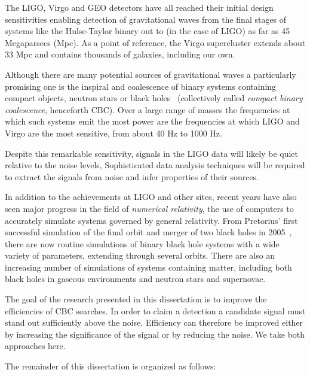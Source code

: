 The LIGO, Virgo and GEO detectors have all reached their initial
design sensitivities enabling detection of gravitational waves from
the final stages of systems like the Hulse-Taylor binary out to (in
the case of LIGO) as far as 45 Megaparsecs (Mpc).  As a point of
reference, the Virgo supercluster extends about 33 Mpc and contains
thousands of galaxies, including our own.

Although there are many potential sources of gravitational waves
a particularly promising one is the inspiral and coalescence of
binary systems containing compact objects, neutron stars or black
holes~\cite{thorne.k:1987} (collectively called \emph{compact binary
coalescence}, henceforth CBC).  Over a large range of masses the
frequencies at which such systems emit the most power are the
frequencies at which LIGO and Virgo are the most sensitive, from about
40 Hz to 1000 Hz.

Despite this remarkable sensitivity, signals in the LIGO data will
likely be quiet relative to the noise levels, Sophisticated data
analysis techniques will be required to extract the signals from noise
and infer properties of their sources.

In addition to the achievements at LIGO and other sites, recent years
have also seen major progress in the field of \emph{numerical
relativity}, the use of computers to accurately simulate systems
governed by general relativity.  From Pretorius' first successful
simulation of the final orbit and merger of two black holes in
2005~\cite{Pretorius:2005gq}, there are now routine simulations of
binary black hole systems with a wide variety of parameters, extending
through several orbits.  There are also an increasing number of
simulations of systems containing matter, including both black holes
in gaseous environments and neutron stars and supernovae.  

The goal of the research presented in this dissertation is to improve
the efficiencies of CBC searches.  In order to claim a detection a
candidate signal must stand out sufficiently above the noise.
Efficiency can therefore be improved either by increasing the
significance of the signal or by reducing the noise.  We take both
approaches here.

The remainder of this dissertation is organized as follows:

